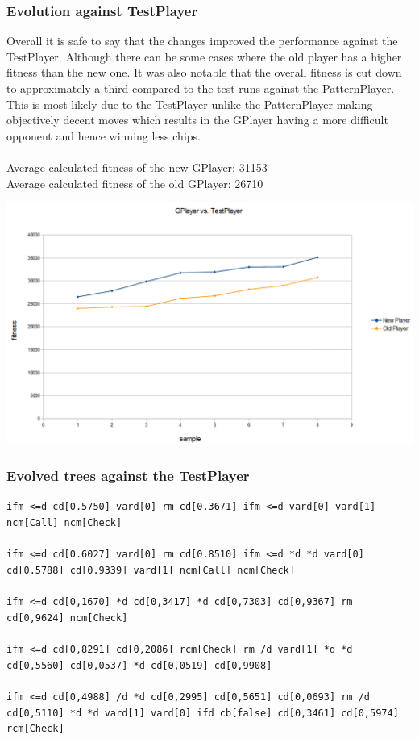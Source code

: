 \documentclass[12pt,fleqn,a4paper]{article}
\begin{document}
\subsubsection{Evolution against TestPlayer}
Overall it is safe to say that the changes improved the performance against the TestPlayer. Although there can be some cases where the old player has a higher fitness than the new one. It was also notable that the overall fitness is cut down to approximately a third compared to the test runs against the PatternPlayer. This is most likely due to the TestPlayer unlike the PatternPlayer making objectively decent moves which results in the GPlayer having a more difficult opponent and hence winning less chips.\\
\\
Average calculated fitness of the new GPlayer: 31153\\
Average calculated fitness of the old GPlayer: 26710

\begin{center}
	\includegraphics[width=.9\textwidth]{gp_vs_tp_1.png}
\end{center}

\subsubsection{Evolved trees against the TestPlayer}
\texttt{ifm <=d cd[0.5750] vard[0] rm cd[0.3671] ifm <=d vard[0] vard[1] ncm[Call] ncm[Check]} \\ \\
\texttt{ifm <=d cd[0.6027] vard[0] rm cd[0.8510] ifm <=d *d *d vard[0] cd[0.5788] cd[0.9339] vard[1] ncm[Call] ncm[Check]}\\ \\
\texttt{ifm <=d cd[0,1670] *d cd[0,3417] *d cd[0,7303] cd[0,9367] rm cd[0,9624] ncm[Check]}\\ \\
\texttt{ifm <=d cd[0,8291] cd[0,2086] rcm[Check] rm /d vard[1] *d *d cd[0,5560] cd[0,0537] *d cd[0,0519] cd[0,9908]}\\ \\
\texttt{ifm <=d cd[0,4988] /d *d cd[0,2995] cd[0,5651] cd[0,0693] rm /d cd[0,5110] *d *d vard[1] vard[0] ifd cb[false] cd[0,3461] cd[0,5974] rcm[Check]}
\end{document}
